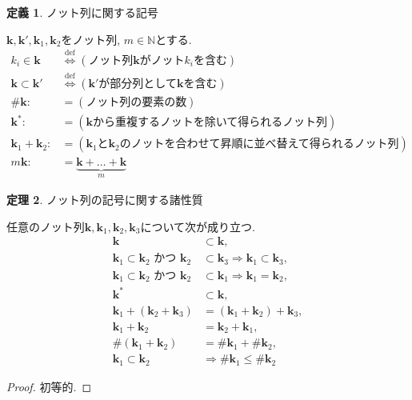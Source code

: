 \documentclass{jsarticle}
\newcommand\subknot[1]{{#1}^*}
\newcommand\Pare[1]{\left(#1\right)}
\newcommand\Def{\overset{\mathrm{def}}{\Longleftrightarrow}}
\theoremstyle{definition}%
\newtheorem{thm}{定理}
\newtheorem{defn}[thm]{定義}
\newtheorem*{rem}{注意}
\newcommand\UC{\textcolor{red}{(執筆中です)}}
\begin{document}
\begin{screen}
	\begin{defn}
		ノット列に関する記号

		$\bm{k}, \bm{k}', \bm{k}_1, \bm{k}_2$をノット列, $m\in\mathbb{N}$とする.
		\begin{align}
			k_{i}\in\bm{k}&\Def(\text{ノット列$\bm{k}$がノット$k_{i}$を含む}) \\
			\bm{k}\subset\bm{k}'&\Def(\text{$\bm{k}'$が部分列として$\bm{k}$を含む}) \\
				\#{\bm{k}}:&=(\text{ノット列の要素の数}) \\
			\subknot{\bm{k}}:&=(\text{$\bm{k}$から重複するノットを除いて得られるノット列}) \\
			\bm{k}_1+\bm{k}_2:&=(\text{$\bm{k}_1$と$\bm{k}_2$のノットを合わせて昇順に並べ替えて得られるノット列}) \\
			m\bm{k}:&=\underbrace{\bm{k}+\dots+\bm{k}}_{m}
		\end{align}
	\end{defn}
\end{screen}


\begin{screen}
	\begin{thm}
		ノット列の記号に関する諸性質

		任意のノット列$\bm{k}, \bm{k}_1, \bm{k}_2, \bm{k}_3$について次が成り立つ.
		\begin{align}
			\bm{k}&\subset\bm{k}, \\
			\bm{k}_1\subset\bm{k}_2 \text{ かつ } \bm{k}_2&\subset\bm{k}_3\Rightarrow \bm{k}_1\subset\bm{k}_3, \\
			\bm{k}_1\subset\bm{k}_2 \text{ かつ } \bm{k}_2&\subset\bm{k}_1\Rightarrow \bm{k}_1=\bm{k}_2, \\
			\subknot{\bm{k}}&\subset\bm{k}, \\
			\bm{k}_1+(\bm{k}_2+\bm{k}_3)&=(\bm{k}_1+\bm{k}_2)+\bm{k}_3, \\
			\bm{k}_1+\bm{k}_2&=\bm{k}_2+\bm{k}_1, \\
			\#\Pare{\bm{k}_1+\bm{k}_2}&=\#{\bm{k}_1}+\#{\bm{k}_2}, \\
			\bm{k}_1\subset\bm{k}_2&\Rightarrow\#{\bm{k}_1}\leq\#{\bm{k}_2}
		\end{align}
	\end{thm}
\end{screen}
\begin{proof}
	初等的.
\end{proof}
%
\end{document}

